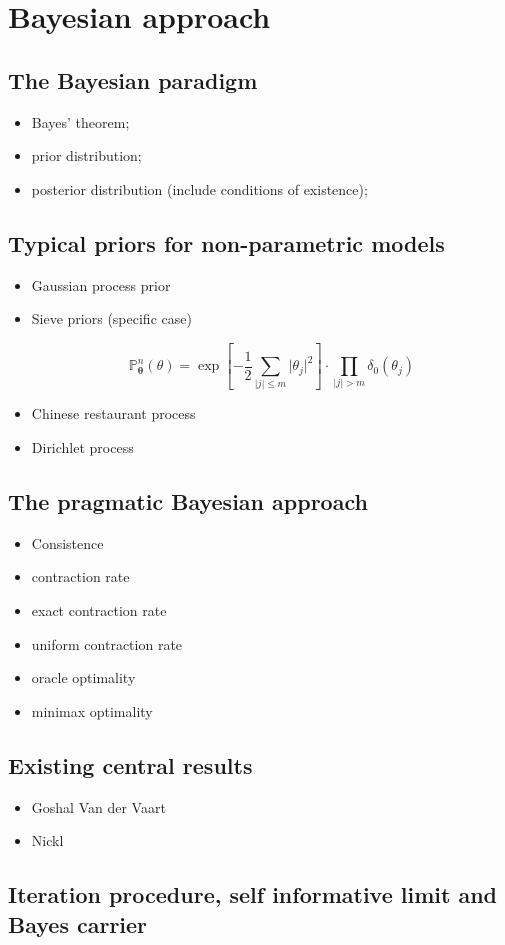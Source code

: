 \section{Bayesian approach}\label{INTRO_BAYES}

\subsection{The Bayesian paradigm}\label{INTRO_BAYES_PARADIGM}
\begin{itemize}
\item Bayes' theorem;
\item prior distribution;
\item posterior distribution (include conditions of existence);
\end{itemize}

\subsection{Typical priors for non-parametric models}\label{INTRO_BAYES_PRIOR}
\begin{itemize}
\item Gaussian process prior
\item Sieve priors (specific case)

\[\mathds{P}^{n}_{\boldsymbol{\theta}}(\theta) = \exp\left[-\frac{1}{2}\sum\limits_{\vert j \vert \leq m} \vert \theta_{j} \vert^{2}\right] \cdot \prod\limits_{\vert j \vert > m}\delta_{0}(\theta_{j})\]

\item Chinese restaurant process
\item Dirichlet process
\end{itemize}

\subsection{The pragmatic Bayesian approach}\label{INTRO_BAYES_PRAGMATIC}
\begin{itemize}
\item Consistence
\item contraction rate
\item exact contraction rate
\item uniform contraction rate
\item oracle optimality
\item minimax optimality
\end{itemize}

\subsection{Existing central results}\label{INTRO_BAYES_BIBLIO}
\begin{itemize}
\item Goshal Van der Vaart
\item Nickl
\end{itemize}

\subsection{Iteration procedure, self informative limit and Bayes carrier}\label{INTRO_BAYES_ITERATIVE}